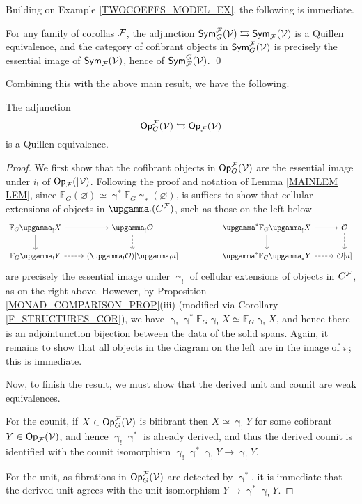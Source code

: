 \documentclass[a4paper,10pt]{article}%
\begin{document}
Building on Example \ref{TWOCOEFFS_MODEL_EX}, the following is immediate.
\begin{lemma}
        For any family of corollas $\mathcal F$, the adjunction $\mathsf{Sym}_G^{\mathcal F}(\mathcal V) \leftrightarrows \mathsf{Sym}_{\mathcal F}(\mathcal V)$ is a Quillen equivalence, and the category of cofibrant objects in $\mathsf{Sym}_G^{\mathcal F}(\mathcal V)$ is precisely the essential image of $\mathsf{Sym}_{\mathcal F}(\mathcal V)$, hence of $\mathsf{Sym}_{\mathcal F}^G(\mathcal V)$. \qed
\end{lemma}
Combining this with the above main result, we have the following.
\begin{theorem}
        The adjunction
        \[
        \mathsf{Op}_G^{\mathcal F}(\mathcal V) \leftrightarrows \mathsf{Op}_{\mathcal F}(\mathcal V)
        \]
        is a Quillen equivalence.
\end{theorem}
\begin{proof}
        We first show that the cofibrant objects in $\mathsf{Op}_G^{\mathcal F}(\mathcal V)$ are the essential image under $i_!$ of $\mathsf{Op}_{\mathcal F}(|\mathcal V)$. 
        Following the proof and notation of Lemma \ref{MAINLEM LEM}, since $\mathbb F_G(\varnothing) \simeq \upgamma^*\mathbb F_G \upgamma_*(\varnothing)$, is suffices to show that cellular extensions of objects in $\upgamma_!(C^\F)$, such as those on the left below
        \[
        \begin{tikzcd}
                \mathbb F_G \upgamma_! X \arrow[d] \arrow[r] &
                \upgamma_! \O \arrow[dashed, d] & & 
                \upgamma^*\mathbb F_G \upgamma_! X \arrow[d] \arrow[r] &
                \O \arrow[d, dashed]
                \\
                \mathbb F_G \upgamma_! Y \arrow[r, dashed] &
                (\upgamma_!\O)[\upgamma_! u] &&
                \upgamma^* \mathbb F_G \upgamma_* Y \arrow[r, dashed] & \O[u]
        \end{tikzcd}
        \]
        are precisely the essential image under $\upgamma_!$ of cellular extensions of objects in $C^{\mathcal F}$, as on the right above. 
        However, by Proposition \ref{MONAD_COMPARISON_PROP}(iii) (modified via Corollary \ref{F_STRUCTURES_COR}), we have
        $\upgamma_!\upgamma^* \mathbb F_G \upgamma_! X \simeq \mathbb F_G \upgamma_! X$,
        and hence there is an adjointunction bijection between the data of the solid spans.
        Again, it remains to show that all objects in the diagram on the left are in the image of $i_!$; this is immediate.

        Now, to finish the result, we must show that the derived unit and counit are weak equivalences.
        
        For the counit, if $X\in \mathsf{Op}_G^{\mathcal F}(\mathcal V)$ is bifibrant then $X \simeq \upgamma_! Y$ for some cofibrant $Y \in \mathsf{Op}_{\mathcal F}(\mathcal V)$, and hence $\upgamma_!\upgamma^*$ is already derived, and thus the derived counit is identified with the counit isomorphism $\upgamma_!\upgamma^*\upgamma_! Y \to \upgamma_! Y$. 

        For the unit, as fibrations in $\mathsf{Op}_G^{\mathcal F}(\mathcal V)$ are detected by $\upgamma^*$, it is immediate that the derived unit agrees with the unit isomorphism $Y \to \upgamma^*\upgamma_! Y$.
\end{proof}
\end{document}
